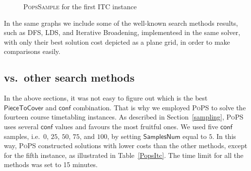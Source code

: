 \documentclass{ws-ijait}
\begin{document}
\begin{figure}
  \centering
  
  \caption{{\normalfont\textsc{PopsSample}} for the first
           ITC instance\label{ITC1}}
\end{figure}

In the same graphs we include some of the well-known search
methods results, such as DFS, LDS, and Iterative Broadening,
implementesd in the same solver, with only their best
solution cost depicted as a plane grid, in order to make
comparisons easily.

\subsection{\PoPS{} vs.\ other search methods}

In the above sections, it was not easy to figure out which
is the best $\mathsf{PieceToCover}$ and $\mathsf{conf}$
combination. That is why we employed \textsc{PoPS} to solve
the fourteen course timetabling instances. As described in
Section~\ref{sampling}, \textsc{PoPS} uses several
$\mathsf{conf}$ values and favours the most fruitful ones.
We used five $\mathsf{conf}$ samples, i.e.\ $0$, $25$, $50$,
$75$, and $100$, by setting $\mathsf{SamplesNum}$ equal to
$5$. In this way, \textsc{PoPS} constructed solutions with
lower costs than the other methods, except for the fifth
instance, as illustrated in Table~\ref{PopsItc}. The time
limit for all the methods was set to 15 minutes.
\end{document}

